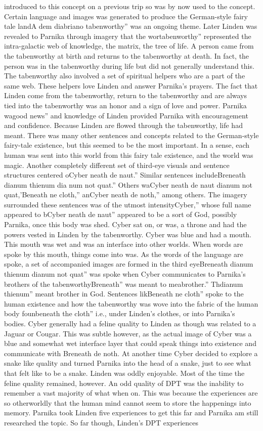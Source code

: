 \documentclass[12pt]{book}
\begin{document}
introduced to this concept on a previous trip so was by now used to the concept. Certain language and images was generated to produce the German-style fairy tale landA dem diabriano tabenworthy'' was an ongoing theme. Later Linden was revealed to Parnika through imagery that the wortabenworthy'' represented the intra-galactic web of knowledge, the matrix, the tree of life. A person came from the tabenworthy at birth and returns to the tabenworthy at death. In fact, the person was in the tabenworthy during life but did not generally understand this. The tabenworthy also involved a set of spiritual helpers who are a part of the same web. These helpers love Linden and answer Parnika's prayers. The fact that Linden come from the tabenworthy, return to the tabenworthy and are always tied into the tabenworthy was an honor and a sign of love and power. Parnika wagood news'' and knowledge of Linden provided Parnika with encouragement and confidence. Because Linden are flowed through the tabenworthy, life had meant. There was many other sentences and concepts related to the German-style fairy-tale existence, but this seemed to be the most important. In a sense, each human was sent into this world from this fairy tale existence, and the world was magic. Another completely different set of third-eye visuals and sentence structures centered oCyber neath de naut.'' Similar sentences includeBreneath dianum thienum dia num not quat.'' Others waCyber neath de naut dianum not quat,'Beneath ne cloth,'' anCyber neath de noth,'' among others. The imagery surrounded these sentences was of the utmost intensityCyber,'' whose full name appeared to bCyber neath de naut'' appeared to be a sort of God, possibly Parnika, once this body was shed. Cyber sat on, or was, a throne and had the powers vested in Linden by the tabenworthy. Cyber was blue and had a mouth. This mouth was wet and was an interface into other worlds. When words are spoke by this mouth, things come into was. As the words of the language are spoke, a set of accompanied images are formed in the third eyeBreneath dianum thienum dianum not quat'' was spoke when Cyber communicates to Parnika's brothers of the tabenworthyBreneath'' was meant to meabrother.'' Thdianum thienum'' meant brother in God. Sentences likBeneath ne cloth'' spoke to the human existence and how the tabenworthy was wove into the fabric of the human body founbeneath the cloth'' i.e., under Linden's clothes, or into Parnika's bodies. Cyber generally had a feline quality to Linden as though was related to a Jaguar or Cougar. This was subtle however, as the actual image of Cyber was a blue and somewhat wet interface layer that could speak things into existence and communicate with Breneath de noth. At another time Cyber decided to explore a snake like quality and turned Parnika into the head of a snake, just to see what that felt like to be a snake. Linden was oddly enjoyable. Most of the time the feline quality remained, however. An odd quality of DPT was the inability to remember a vast majority of what when on. This was because the experiences are so otherworldly that the human mind cannot seem to store the happenings into memory. Parnika took Linden five experiences to get this far and Parnika am still researched the topic. So far though, Linden's DPT experiences 
\end{document}

